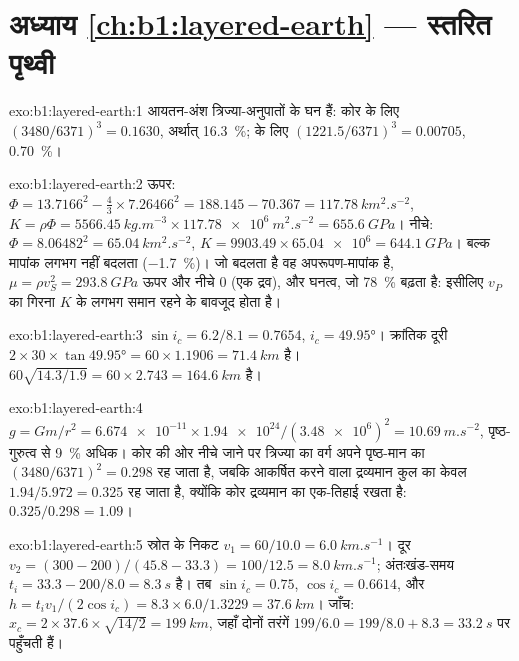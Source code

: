 \section*{अध्याय \ref{ch:b1:layered-earth} --- स्तरित पृथ्वी}

\begin{solution}{exo:b1:layered-earth:1}
आयतन-अंश त्रिज्या-अनुपातों के घन हैं: कोर के लिए $(3480/6371)^3 = 0.1630$, अर्थात् \qty{16.3}{\percent};  के लिए
$(1221.5/6371)^3 = 0.00705$, \qty{0.70}{\percent}।
\end{solution}

\begin{solution}{exo:b1:layered-earth:2}
ऊपर: $\Phi = 13.7166^2 - \tfrac43\times7.26466^2 = 188.145 - 70.367 =
\qty{117.78}{km^2.s^{-2}}$, $K = \rho\Phi = \qty{5566.45}{kg.m^{-3}}\times
\qty{117.78e6}{m^2.s^{-2}} = \qty{655.6}{GPa}$। नीचे: $\Phi = 8.06482^2 =
\qty{65.04}{km^2.s^{-2}}$, $K = 9903.49\times\num{65.04e6} = \qty{644.1}{GPa}$।
बल्क मापांक लगभग नहीं बदलता (\qty{-1.7}{\percent})। जो बदलता है वह अपरूपण-मापांक है, $\mu = \rho v_S^2 = \qty{293.8}{GPa}$
ऊपर और नीचे $0$ (एक द्रव), और घनत्व, जो \qty{78}{\percent} बढ़ता है: इसीलिए $v_P$ का गिरना $K$ के लगभग समान रहने के बावजूद होता है।
\end{solution}

\begin{solution}{exo:b1:layered-earth:3}
$\sin i_c = 6.2/8.1 = 0.7654$, $i_c = \ang{49.95}$। क्रांतिक दूरी
$2\times30\times\tan\ang{49.95} = 60\times1.1906 = \qty{71.4}{km}$ है।  $60\sqrt{14.3/1.9} = 60\times2.743 = \qty{164.6}{km}$ है।
\end{solution}

\begin{solution}{exo:b1:layered-earth:4}
$g = Gm/r^2 = \num{6.674e-11}\times\num{1.94e24}/(\num{3.48e6})^2 =
\qty{10.69}{m.s^{-2}}$, पृष्ठ-गुरुत्व से \qty{9}{\percent} अधिक। कोर की ओर नीचे जाने पर त्रिज्या का वर्ग अपने पृष्ठ-मान का
$(3480/6371)^2 = 0.298$ रह जाता है, जबकि आकर्षित करने वाला द्रव्यमान कुल का केवल $1.94/5.972 = 0.325$ रह जाता है,
क्योंकि कोर द्रव्यमान का एक-तिहाई रखता है: $0.325/0.298 = 1.09$।
\end{solution}

\begin{solution}{exo:b1:layered-earth:5}
स्रोत के निकट $v_1 = 60/10.0 = \qty{6.0}{km.s^{-1}}$। दूर
$v_2 = (300 - 200)/(45.8 - 33.3) = 100/12.5 = \qty{8.0}{km.s^{-1}}$; अंतःखंड-समय
$t_i = 33.3 - 200/8.0 = \qty{8.3}{s}$ है। तब $\sin i_c =
0.75$, $\cos i_c = 0.6614$, और $h = t_i v_1/(2\cos i_c) = 8.3\times6.0/1.3229
= \qty{37.6}{km}$। जाँच: $x_c = 2\times37.6\times\sqrt{14/2} = \qty{199}{km}$,
जहाँ दोनों तरंगें $199/6.0 = 199/8.0 + 8.3 = \qty{33.2}{s}$ पर पहुँचती हैं।
\end{solution}

